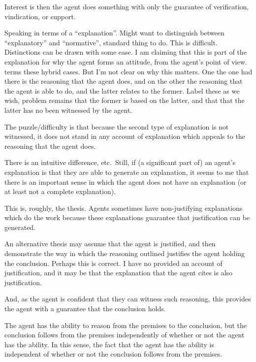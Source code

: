 \documentclass[10pt]{article}
\newcommand{\hozlinedash}[0]{%
  \noindent\hdashrule[0.5ex][c]{\textwidth}{.1pt}{2.5pt}
}
\begin{document}
Interest is then the agent does something with only the guarantee of verification, vindication, or support.

Speaking in terms of a ``explanation''.
Might want to distinguish between ``explanatory'' and ``normative'', standard thing to do.
This is difficult.
Distinctions can be drawn with some ease.
I am claiming that this is part of the explanation for why the agent forms an attitude, from the agent's point of view.
\citeauthor{Hieronymi:2011aa} terms these hybrid cases.
But I'm not clear on why this matters.
One the one had there is the reasoning that the agent does, and on the other the reasoning that the agent is able to do, and the latter relates to the former.
Label these as we wish, problem remains that the former is based on the latter, and that that the latter has no been witnessed by the agent.

The puzzle/difficulty is that because the second type of explanation is not witnessed, it does not stand in any account of explanation which appeals to the reasoning that the agent does.

{
  \color{red}
  There is an intuitive difference, etc.\
  Still, if (a significant part of) an agent's explanation is that they are able to generate an explanation, it seems to me that there is an important sense in which the agent does not have an explanation (or at least not a complete explanation).
}


\hozlinedash


This is, roughly, the thesis.
Agents sometimes have non-justifying explanations which do the work because these explanations guarantee that justification can be generated.

An alternative thesis may assume that the agent is justified, and then demonstrate the way in which the reasoning outlined justifies the agent holding the conclusion.
Perhaps this is correct.
I have no provided an account of justification, and it may be that the explanation that the agent cites is also justification.


And, as the agent is confident that they can witness such reasoning, this provides the agent with a guarantee that the conclusion holds.

The agent has the ability to reason from the premises to the conclusion, but the conclusion follows from the premises independently of whether or not the agent has the ability.
In this sense, the fact that the agent has the ability is independent of whether or not the conclusion follows from the premises.
\end{document}

